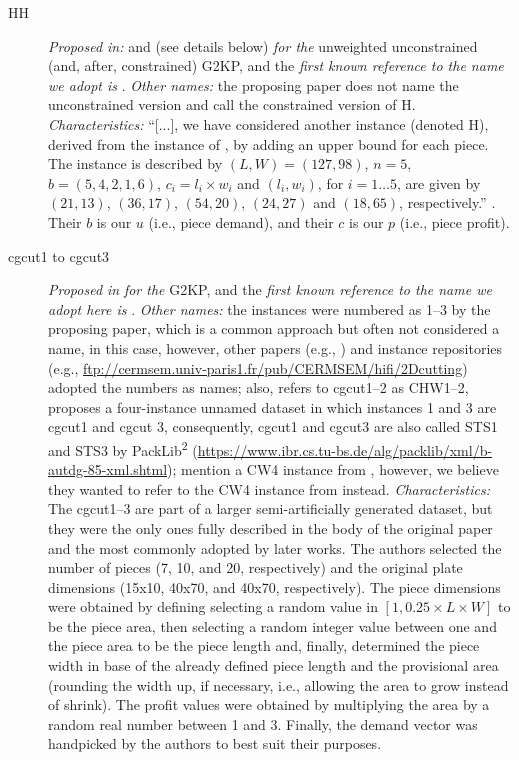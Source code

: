 \documentclass[ppgc,tese,english,formais,babel]{iiufrgs}
\begin{document}
\begin{description}
\item [HH] \emph{Proposed in:} \citet{herz:1972} and \citet{hifi:1997} (see details below) \emph{for the} unweighted unconstrained (and, after, constrained) G2KP, and the \emph{first known reference to the name we adopt is} \citet{cung:2000}. \emph{Other names:} the proposing paper does not name the unconstrained version and \citet{hifi:1997} call the constrained version of H. \emph{Characteristics: } ``[...], we have considered another instance (denoted H), derived from the instance of \citet{herz:1972}, by adding an upper bound for each piece. The instance is described by \((L, W) = (127, 98)\), \(n = 5\), \(b = (5, 4, 2, 1, 6)\), \(c_i = l_i \times w_i\) and \((l_i, w_i)\), for \(i = 1 \dots 5\), are given by \((21, 13)\), \((36, 17)\), \((54, 20)\), \((24, 27)\) and \((18, 65)\), respectively.'' \citep{hifi:1997}. Their \(b\) is our \(u\) (i.e., piece demand), and their \(c\) is our \(p\) (i.e., piece profit).
\item [cgcut1 to cgcut3] \emph{Proposed in} \citet{cw:1977} \emph{for the} G2KP, and the \emph{first known reference to the name we adopt here is} \citet{martello:1998}. \emph{Other names:} the instances were numbered as 1--3 by the proposing paper, which is a common approach but often not considered a name, in this case, however, other papers (e.g., \citet{hifi:1997}) and instance repositories (e.g., \url{ftp://cermsem.univ-paris1.fr/pub/CERMSEM/hifi/2Dcutting}) adopted the numbers as names; also, \citet{fayard:1998} refers to cgcut1--2 as CHW1--2, \citet{tschoke:1995} proposes a four-instance unnamed dataset in which instances 1 and 3 are cgcut1 and cgcut 3, consequently, cgcut1 and cgcut3 are also called STS1 and STS3 by PackLib\textsuperscript{2} (\url{https://www.ibr.cs.tu-bs.de/alg/packlib/xml/b-autdg-85-xml.shtml}); \citet{velasco:2019} mention a CW4 instance from \citet{cw:1977}, however, we believe they wanted to refer to the CW4 instance from \citet{fayard:1998} instead. \emph{Characteristics:} The cgcut1--3 are part of a larger semi-artificially generated dataset, but they were the only ones fully described in the body of the original paper and the most commonly adopted by later works. The authors selected the number of pieces (7, 10, and 20, respectively) and the original plate dimensions (15x10, 40x70, and 40x70, respectively). The piece dimensions were obtained by defining selecting a random value in \([1, 0.25\times L \times W]\) to be the piece area, then selecting a random integer value between one and the piece area to be the piece length and, finally, determined the piece width in base of the already defined piece length and the provisional area (rounding the width up, if necessary, i.e., allowing the area to grow instead of shrink). The profit values were obtained by multiplying the area by a random real number between 1 and 3. Finally, the demand vector was handpicked by the authors to best suit their purposes.

\end{description}
\end{document}
